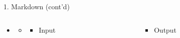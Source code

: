\documentclass[14pt, aspectratio=169, sectionpage=simple, xclolor=table]{beamer}
\begin{document}
\begin{frame}[fragile, t]{1. Markdown (cont'd)}
\begin{itemize}
\item {}
\begin{itemize}
\item[] 

\begin{columns}
\begin{column}{0.45\textwidth}
\vspace{1cm}
\begin{itemize}
\item Input

\end{itemize}
\end{column}%
\hfill
\begin{column}{0.45\textwidth}
\vspace{0cm}
\begin{itemize}
	\item Output
	\\
	
\end{itemize}
\end{column}%
\end{columns}
\end{itemize}
\end{itemize}
\end{frame}
\end{document}
